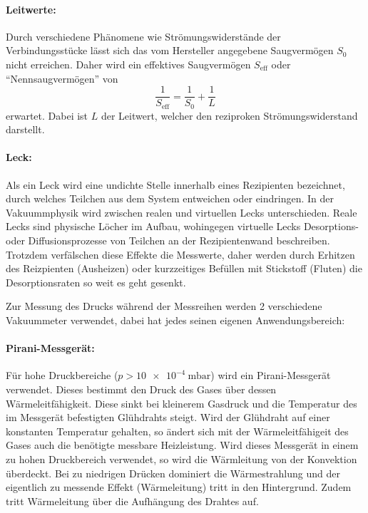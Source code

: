 \paragraph{Leitwerte:}
Durch verschiedene Phänomene wie Strömungswiderstände der Verbindungsstücke
lässt sich das vom Hersteller angegebene Saugvermögen $S_0$ nicht erreichen.
Daher wird ein effektives Saugvermögen $S_\text{eff}$ oder \enquote{Nennsaugvermögen} von
\begin{equation}
   \frac{1}{S_\text{eff}} = \frac{1}{S_0} + \frac{1}{L}
   \label{eqn:effSaug}
\end{equation}
erwartet.
Dabei ist $L$ der Leitwert, welcher den reziproken Strömungswiderstand darstellt.

\paragraph{Leck:}
Als ein Leck wird eine undichte Stelle innerhalb eines Rezipienten bezeichnet,
durch welches Teilchen aus dem System entweichen oder eindringen.
In der Vakuummphysik wird zwischen realen und virtuellen Lecks unterschieden.
Reale Lecks sind physische Löcher im Aufbau,
wohingegen virtuelle Lecks Desorptions- oder Diffusionsprozesse von Teilchen an der
Rezipientenwand beschreiben.
Trotzdem verfälschen diese Effekte die Messwerte,
daher werden durch Erhitzen des Reizpienten (Ausheizen)
oder kurzzeitiges Befüllen mit Stickstoff (Fluten) die Desorptionsraten so weit es geht gesenkt.

Zur Messung des Drucks während der Messreihen werden 2 verschiedene Vakuummeter verwendet,
dabei hat jedes seinen eigenen Anwendungsbereich:

\paragraph{Pirani-Messgerät:}
Für hohe Druckbereiche ($p > \SI{10e-4}{\milli\bar}$) wird ein Pirani-Messgerät verwendet.
Dieses bestimmt den Druck des Gases über dessen Wärmeleitfähigkeit.
Diese sinkt bei kleinerem Gasdruck und die Temperatur des im Messgerät befestigten Glühdrahts steigt.
Wird der Glühdraht auf einer konstanten Temperatur gehalten,
so ändert sich mit der Wärmeleitfähigeit des Gases auch die benötigte messbare Heizleistung.
Wird dieses Messgerät in einem zu hohen Druckbereich verwendet,
so wird die Wärmleitung von der Konvektion überdeckt.
Bei zu niedrigen Drücken dominiert die Wärmestrahlung
und der eigentlich zu messende Effekt (Wärmeleitung) tritt in den Hintergrund.
Zudem tritt Wärmeleitung über die Aufhängung des Drahtes auf.

